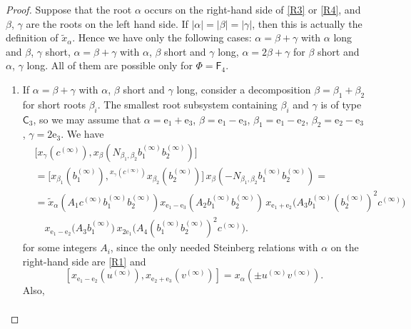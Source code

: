 \documentclass{article}
\numberwithin{equation}{section}
\theoremstyle{definition}
\theoremstyle{remark}
\newcommand{\up}[2]{{^{#1}\!{#2}}}
\newcommand{\rC}{\mathsf{C}}
\newcommand{\rF}{\mathsf{F}}
\begin{document}
\begin{proof}

Suppose that the root \(\alpha\) occurs on the right-hand side of \eqref{R3} or \eqref{R4}, and \(\beta\), \(\gamma\) are the roots on the left hand side. If \(|\alpha| = |\beta| = |\gamma|\), then this is actually the definition of \(\widetilde x_\alpha\). Hence we have only the following cases: \(\alpha = \beta + \gamma\) with \(\alpha\) long and \(\beta\), \(\gamma\) short, \(\alpha = \beta + \gamma\) with \(\alpha\), \(\beta\) short and \(\gamma\) long, \(\alpha = 2\beta + \gamma\) for \(\beta\) short and \(\alpha\), \(\gamma\) long. All of them are possible only for \(\Phi = \rF_4\).

\begin{enumerate}
 \item If \(\alpha = \beta + \gamma\) with \(\alpha\), \(\beta\) short and \(\gamma\) long, consider a decomposition \(\beta = \beta_1 + \beta_2\) for short roots \(\beta_i\). The smallest root subsystem containing \(\beta_i\) and \(\gamma\) is of type \(\rC_3\), so we may assume that \(\alpha = \mathrm e_1 + \mathrm e_3\), \(\beta = \mathrm e_1 - \mathrm e_3\), \(\beta_1 = \mathrm e_1 - \mathrm e_2\), \(\beta_2 = \mathrm e_2 - \mathrm e_3\), \(\gamma = 2\mathrm e_3\). We have
 \begin{align*}
  &\bigl[x_\gamma(c^{(\infty)}),
  x_\beta(N_{\beta_1, \beta_2} b_1^{(\infty)} b_2^{(\infty)})\bigr]\\
  &= \bigl[x_{\beta_1}(b_1^{(\infty)}),
  \up{x_\gamma(c^{(\infty)})}
   {x_{\beta_2}(b_2^{(\infty)})}\bigr]\,
  x_\beta(-N_{\beta_1, \beta_2} b_1^{(\infty)} b_2^{(\infty)}) =\\
  &= \widetilde x_\alpha(A_1 c^{(\infty)} b_1^{(\infty)} b_2^{(\infty)})
  x_{\mathrm e_1 - \mathrm e_3}(A_2 b_1^{(\infty)} b_2^{(\infty)})\,
  x_{\mathrm e_1 + \mathrm e_2}\bigl(A_3 b_1^{(\infty)} (b_2^{(\infty)})^2 c^{(\infty)}\bigr)\\
  &\quad x_{\mathrm e_1 - \mathrm e_2}\bigl(A_3 b_1^{(\infty)}\bigr)\,
  x_{2\mathrm e_1}\bigl(A_4 (b_1^{(\infty)} b_2^{(\infty)})^2 c^{(\infty)} \bigr).
 \end{align*}
 for some integers \(A_i\), since the only needed Steinberg relations with \(\alpha\) on the right-hand side are \eqref{R1} and
 \[[x_{\mathrm e_1 - \mathrm e_2}(u^{(\infty)}), x_{\mathrm e_2 + \mathrm e_3}(v^{(\infty)})] = x_\alpha(\pm u^{(\infty)} v^{(\infty)}).\]
 Also,
 \begin{align*}

\end{align*}
\end{enumerate}
\end{proof}
\end{document}
